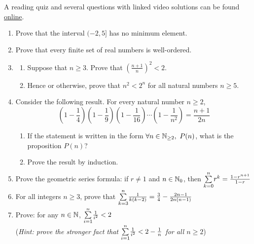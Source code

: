 \begin{exercises}
	A reading quiz and several questions with linked video solutions can be found \href{http://www.math.uci.edu/~ndonalds/math13/selftest/5-2-wellorder.html}{online}.

	\begin{enumerate}
  	\item Prove that the interval $(-2,5]$ has no minimum element.
	
	
		\item Prove that every finite set of real numbers is well-ordered.
  
  
  	\item\begin{enumerate}
    	\item Suppose that $n\ge 3$. Prove that $\left(\frac{n+1}n\right)^2<2$.
    	\item Hence or otherwise, prove that $n^2<2^n$ for all natural numbers $n\ge 5$.
  	\end{enumerate}
  	

	  \item Consider the following result. For every natural number $n\ge 2$,
		\[
			\left(1-\frac{1}{4}\right) \left(1-\frac{1}{9}\right) \left(1-\frac{1}{16}\right) \cdots \left(1-\frac{1}{n^2}\right) = \frac{n+1}{2n}
		\]
	  \begin{enumerate}
	    \item If the statement is written in the form $\forall n\in\mathbb{N}_{\ge 2},\ P(n)$, what is the proposition $P(n)$?
	    \item Prove the result by induction.
	  \end{enumerate}
	  
	  
	
		\item Prove the geometric series formula: if $r\neq 1$ and $n\in\mathbb{N}_0$, then
			$\smash{\sum\limits_{k=0}^n}r^k=\frac{1-r^{n+1}}{1-r}$
			
		
		\item For all integers $n\ge 3$, prove that $\smash{\sum\limits_{k=3}^n}\frac 1{k(k-2)} =\frac 34-\frac{2n-1}{2n(n-1)}$	
		
		
		\item Prove: for any $n\in\mathbb{N}$, $\smash{\sum\limits_{i=1}^n}\frac{1}{i^2}<2$\par
	(\emph{Hint: prove the stronger fact that $\smash{\sum\limits_{i=1}^n} \frac{1}{i^2} < 2 - \frac{1}{n}$ for all $n \ge 2$})
	

\end{enumerate}
\end{exercises}
